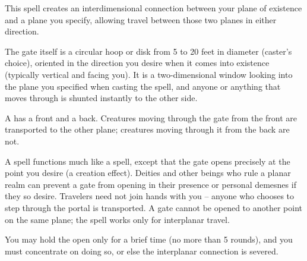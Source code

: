 \spellrng{\rngmed}
\begin{spelleffect}
This spell creates an interdimensional connection between your plane of existence and a plane you specify, allowing travel between those two planes in either direction.
\par The gate itself is a circular hoop or disk from 5 to 20 feet in diameter (caster's choice), oriented in the direction you desire when it comes into existence (typically vertical and facing you). It is a two-dimensional window looking into the plane you specified when casting the spell, and anyone or anything that moves through is shunted instantly to the other side.
\par A  has a front and a back. Creatures moving through the gate from the front are transported to the other plane; creatures moving through it from the back are not.
\par A  spell functions much like a  spell, except that the gate opens precisely at the point you desire (a creation effect). Deities and other beings who rule a planar realm can prevent a gate from opening in their presence or personal demesnes if they so desire. Travelers need not join hands with you -- anyone who chooses to step through the portal is transported. A gate cannot be opened to another point on the same plane; the spell works only for interplanar travel.
\par You may hold the  open only for a brief time (no more than 5 rounds), and you must concentrate on doing so, or else the interplanar connection is severed.
\end{spelleffect}

